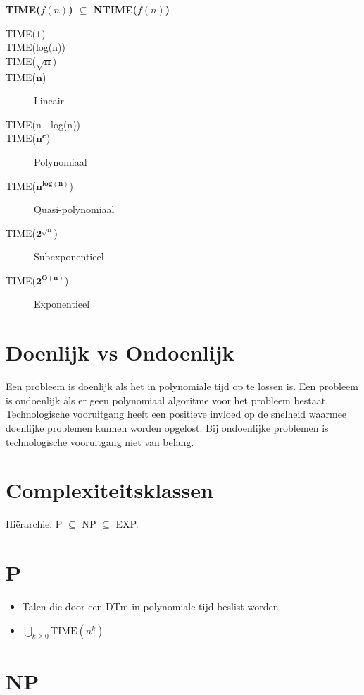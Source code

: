 \documentclass[]{article}
\begin{document}
\textbf{TIME($f(n)$) $\subseteq$ NTIME($f(n)$)}

\bigskip

\begin{description}
\item[TIME($\mathbf{1}$)]
\item[TIME(log(n))]
\item[TIME($\mathbf{\sqrt n}$)]
\item[TIME($\mathbf{n}$)] Lineair
\item[TIME(n $\cdot$ log(n))]
\item[TIME($\mathbf{n^c}$)] Polynomiaal
\item[TIME($\mathbf{n^{log(n)}}$)] Quasi-polynomiaal
\item[TIME($\mathbf{2^{\sqrt n}}$)] Subexponentieel
\item[TIME($\mathbf{2^{O(n)}}$)] Exponentieel
\end{description}

\section*{Doenlijk vs Ondoenlijk}
Een probleem is doenlijk als het in polynomiale tijd op te lossen is. Een probleem is ondoenlijk als er geen polynomiaal algoritme voor het probleem bestaat. Technologische vooruitgang heeft een positieve invloed op de snelheid waarmee doenlijke problemen kunnen worden opgelost. Bij ondoenlijke problemen is technologische vooruitgang niet van belang.

\section*{Complexiteitsklassen}

Hi\"erarchie: P $\subseteq$ NP $\subseteq$ EXP.

\section*{P}

\begin{itemize}
\item Talen die door een DTm in polynomiale tijd beslist worden.
\item $\bigcup_{k\geq 0} \text{TIME}(n^k)$
\end{itemize}

\section*{NP}
\end{document}
